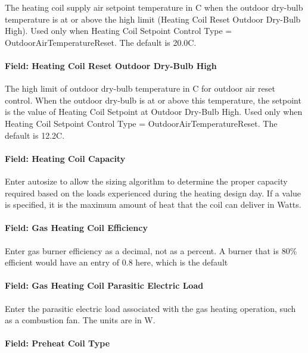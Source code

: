The heating coil supply air setpoint temperature in C when the outdoor dry-bulb temperature is at or above the high limit (Heating Coil Reset Outdoor Dry-Bulb High). Used only when Heating Coil Setpoint Control Type = OutdoorAirTemperatureReset. The default is 20.0C.

\paragraph{Field: Heating Coil Reset Outdoor Dry-Bulb High}\label{field-heating-coil-reset-outdoor-dry-bulb-high-1}

The high limit of outdoor dry-bulb temperature in C for outdoor air reset control. When the outdoor dry-bulb is at or above this temperature, the setpoint is the value of Heating Coil Setpoint at Outdoor Dry-Bulb High. Used only when Heating Coil Setpoint Control Type = OutdoorAirTemperatureReset. The default is 12.2C.

\paragraph{Field: Heating Coil Capacity}\label{field-heating-coil-capacity-4}

Enter autosize to allow the sizing algorithm to determine the proper capacity required based on the loads experienced during the heating design day. If a value is specified, it is the maximum amount of heat that the coil can deliver in Watts.

\paragraph{Field: Gas Heating Coil Efficiency}\label{field-gas-heating-coil-efficiency-6}

Enter gas burner efficiency as a decimal, not as a percent. A burner that is 80\% efficient would have an entry of 0.8 here, which is the default

\paragraph{Field: Gas Heating Coil Parasitic Electric Load}\label{field-gas-heating-coil-parasitic-electric-load-6}

Enter the parasitic electric load associated with the gas heating operation, such as a combustion fan. The units are in W.

\paragraph{Field: Preheat Coil Type}\label{field-preheat-coil-type-2}

